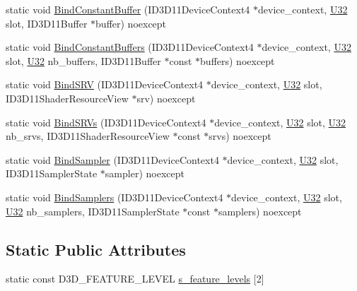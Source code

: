 \begin{DoxyCompactItemize}
\item 
static void \hyperlink{structmage_1_1_pipeline_ab4bfc69d98005a1e929c8a6b33fa07b1}{Bind\+Constant\+Buffer} (I\+D3\+D11\+Device\+Context4 $\ast$device\+\_\+context, \hyperlink{namespacemage_a41c104c036fba3756a74e19f793eeaa1}{U32} slot, I\+D3\+D11\+Buffer $\ast$buffer) noexcept
\item 
static void \hyperlink{structmage_1_1_pipeline_a85bfc6f5a5ad4ff19651a6eaf1c49406}{Bind\+Constant\+Buffers} (I\+D3\+D11\+Device\+Context4 $\ast$device\+\_\+context, \hyperlink{namespacemage_a41c104c036fba3756a74e19f793eeaa1}{U32} slot, \hyperlink{namespacemage_a41c104c036fba3756a74e19f793eeaa1}{U32} nb\+\_\+buffers, I\+D3\+D11\+Buffer $\ast$const $\ast$buffers) noexcept
\item 
static void \hyperlink{structmage_1_1_pipeline_a268c55b2697594adfc6f46afa27ec046}{Bind\+S\+RV} (I\+D3\+D11\+Device\+Context4 $\ast$device\+\_\+context, \hyperlink{namespacemage_a41c104c036fba3756a74e19f793eeaa1}{U32} slot, I\+D3\+D11\+Shader\+Resource\+View $\ast$srv) noexcept
\item 
static void \hyperlink{structmage_1_1_pipeline_a27e4163bd77a976fdb630180ffc3a4ad}{Bind\+S\+R\+Vs} (I\+D3\+D11\+Device\+Context4 $\ast$device\+\_\+context, \hyperlink{namespacemage_a41c104c036fba3756a74e19f793eeaa1}{U32} slot, \hyperlink{namespacemage_a41c104c036fba3756a74e19f793eeaa1}{U32} nb\+\_\+srvs, I\+D3\+D11\+Shader\+Resource\+View $\ast$const $\ast$srvs) noexcept
\item 
static void \hyperlink{structmage_1_1_pipeline_a1635b699c544e31912393fe234535b0f}{Bind\+Sampler} (I\+D3\+D11\+Device\+Context4 $\ast$device\+\_\+context, \hyperlink{namespacemage_a41c104c036fba3756a74e19f793eeaa1}{U32} slot, I\+D3\+D11\+Sampler\+State $\ast$sampler) noexcept
\item 
static void \hyperlink{structmage_1_1_pipeline_a4ed615377474c3b71b0c21b38842248a}{Bind\+Samplers} (I\+D3\+D11\+Device\+Context4 $\ast$device\+\_\+context, \hyperlink{namespacemage_a41c104c036fba3756a74e19f793eeaa1}{U32} slot, \hyperlink{namespacemage_a41c104c036fba3756a74e19f793eeaa1}{U32} nb\+\_\+samplers, I\+D3\+D11\+Sampler\+State $\ast$const $\ast$samplers) noexcept
\end{DoxyCompactItemize}
\subsection*{Static Public Attributes}
\begin{DoxyCompactItemize}
\item 
static const D3\+D\+\_\+\+F\+E\+A\+T\+U\+R\+E\+\_\+\+L\+E\+V\+EL \hyperlink{structmage_1_1_pipeline_a2b8c39e47ee583beb55fa1a8741deb4a}{s\+\_\+feature\+\_\+levels} \mbox{[}2\mbox{]}
\end{DoxyCompactItemize}
